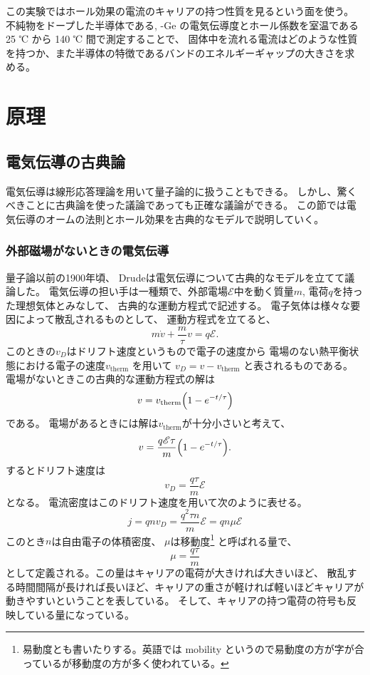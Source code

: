 \documentclass[11pt,dvipdfmx,a4paper]{jsarticle}
\numberwithin{equation}{section}
\begin{document}
この実験ではホール効果の電流のキャリアの持つ性質を見るという面を使う。
不純物をドープした半導体である, \ce-{Ge} の電気伝導度とホール係数を室温である 25 ℃ から 140 ℃ 間で測定することで、
固体中を流れる電流はどのような性質を持つか、また半導体の特徴であるバンドのエネルギーギャップの大きさを求める。

\section{原理}
\subsection*{電気伝導の古典論}
電気伝導は線形応答理論を用いて量子論的に扱うこともできる。
しかし、驚くべきことに古典論を使った議論であっても正確な議論ができる。
この節では電気伝導のオームの法則とホール効果を古典的なモデルで説明していく。
\subsubsection*{外部磁場がないときの電気伝導}
量子論以前の1900年頃、
Drudeは電気伝導について古典的なモデルを立てて議論した。
電気伝導の担い手は一種類で、外部電場\(\mathscr{E}\)中を動く質量\(m\), 電荷\(q\)を持った理想気体とみなして、
古典的な運動方程式で記述する。
電子気体は様々な要因によって散乱されるものとして、
運動方程式を立てると、
\begin{equation}
    m\dot{v} + \frac{m}{\tau}v= q\mathscr{E}.
\end{equation}
このときの\(v_D\)はドリフト速度というもので電子の速度から
電場のない熱平衡状態における電子の速度\(v_{\text{therm}}\)
を用いて
\(
    v_D= v-v_{\text{therm}}
\)
と表されるものである。
電場がないときこの古典的な運動方程式の解は
\begin{equation}
    v = v_{\text{therm}}\qty(1-e^{-t/\tau})
\end{equation}
である。
電場があるときには解は\(v_{\text{therm}}\)が十分小さいと考えて、
\begin{equation}
    v = \frac{q\mathscr{E}\tau}{m}\qty(1-e^{-t/\tau}).
\end{equation}
するとドリフト速度は
\begin{equation}
    v_D=\frac{q\tau}{m}\mathscr{E}
\end{equation}
となる。
電流密度はこのドリフト速度を用いて次のように表せる。
\begin{equation}
    j = qnv_D = \frac{q^2\tau n}{m}\mathscr{E} = qn\mu\mathscr{E}
\end{equation}
このとき\(n\)は自由電子の体積密度、
\(\mu\)は移動度\footnote{易動度とも書いたりする。英語では mobility というので易動度の方が字が合っているが移動度の方が多く使われている。}
と呼ばれる量で、
\begin{equation}
	\mu = \frac{q\tau}{m}
\end{equation}
として定義される。この量はキャリアの電荷が大きければ大きいほど、
散乱する時間間隔が長ければ長いほど、キャリアの重さが軽ければ軽いほどキャリアが動きやすいということを表している。
そして、キャリアの持つ電荷の符号も反映している量になっている。
\end{document}
